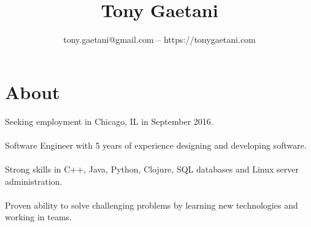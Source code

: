 \documentclass{article}
\title{\bfseries\Large Tony Gaetani}
\author{tony.gaetani@gmail.com -- https://tonygaetani.com}
\date{}
\begin{document}
\maketitle

\section*{About}
Seeking employment in Chicago, IL in September 2016.\\\\
Software Engineer with 5 years of experience designing and developing software.\\\\
Strong skills in C++, Java, Python, Clojure, SQL databases and Linux server administration.\\\\
Proven ability to solve challenging problems by learning new technologies and working in teams.
\end{document}

